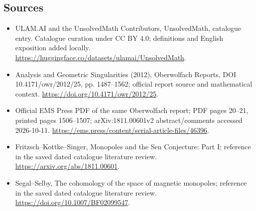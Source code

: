 \documentclass[11pt]{article}
\begin{document}
\subsection{Sources}
\begin{itemize}
\item[\hypertarget{source:statement:1}{S1}] ULAM.AI and the UnsolvedMath Contributors, UnsolvedMath, catalogue entry. Catalogue curation under CC BY 4.0; definitions and English exposition added locally.
\url{https://huggingface.co/datasets/ulamai/UnsolvedMath}.
\item[\hypertarget{source:statement:2}{S2}] Analysis and Geometric Singularities (2012), Oberwolfach Reports, DOI 10.4171/owr/2012/25, pp. 1487--1562; official report source and mathematical context.
\url{https://doi.org/10.4171/owr/2012/25}.
\item[\hypertarget{source:statement:3}{S3}] Official EMS Press PDF of the same Oberwolfach report; PDF pages 20--21, printed pages 1506--1507; arXiv:1811.00601v2 abstract/comments accessed 2026-10-11.
\url{https://ems.press/content/serial-article-files/46396}.
\item[\hypertarget{source:statement:4}{S4}] Fritzsch--Kottke--Singer, Monopoles and the Sen Conjecture: Part I; reference in the saved dated catalogue literature review.
\url{https://arxiv.org/abs/1811.00601}.
\item[\hypertarget{source:statement:5}{S5}] Segal--Selby, The cohomology of the space of magnetic monopoles; reference in the saved dated catalogue literature review.
\url{https://doi.org/10.1007/BF02099547}.
\end{itemize}
\label{end:statement}
\end{document}
